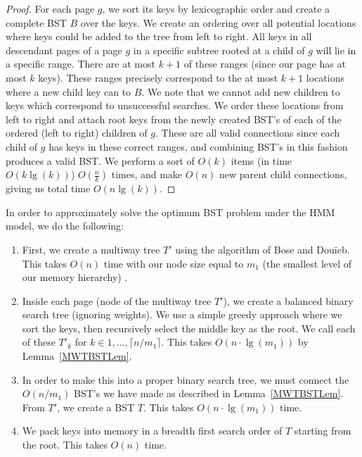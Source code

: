 \documentclass[letterpaper,12pt,titlepage,oneside,final]{book}
\theoremstyle{plain}
\begin{document}
\begin{proof}
For each page $g$, we sort its keys by lexicographic order and create a complete BST $B$ over the keys. We create an ordering over all potential locations where keys could be added to the tree from left to right. All keys in all descendant pages of a page $g$ in a specific subtree rooted at a child of $g$ will lie in a specific range. There are at most $k+1$ of these ranges (since our page has at most $k$ keys). These ranges precisely correspond to the at most $k+1$ locations where a new child key can to $B$. We note that we cannot add new children to keys which correspond to unsuccessful searches. We order these locations from left to right and attach root keys from the newly created BST's of each of the ordered (left to right) children of $g$. These are all valid connections since each child of $g$ has keys in these correct ranges, and combining BST's in this fashion produces a valid BST. We perform a sort of $O(k)$ items (in time $O(k\lg(k))$) $O(\frac{n}{k})$ times, and make $O(n)$ new parent child connections, giving us total time $O(n \lg(k))$.
\end{proof}

In order to approximately solve the optimum BST problem under the HMM model, we do the following:

\begin{enumerate}
\item First, we create a multiway tree $T'$ using the algorithm of Bose and Dou\"{i}eb. This takes $O(n)$ time with our node size equal to $m_1$ (the smallest level of our memory hierarchy) \cite{bose2009efficient}.

\item Inside each page (node of the multiway tree $T'$), we create a balanced binary search tree (ignoring weights). We use a simple greedy approach where we sort the keys, then recursively select the middle key as the root.  We call each of these $T'_k$ for $k \in {1,...,\lceil n/m_1 \rceil}$. This takes $O(n\cdot\lg(m_1))$ by Lemma~\ref{MWTBSTLem}.

\item In order to make this into a proper binary search tree, we must connect the $O(n/m_1)$ BST's we have made as described in Lemma~\ref{MWTBSTLem}. From $T'$, we create a BST $T$. This takes $O(n\cdot\lg(m_1))$ time.

\item We pack keys into memory in a breadth first search order of $T$ starting from the root. This takes $O(n)$ time.

\end{enumerate}
\end{document}
